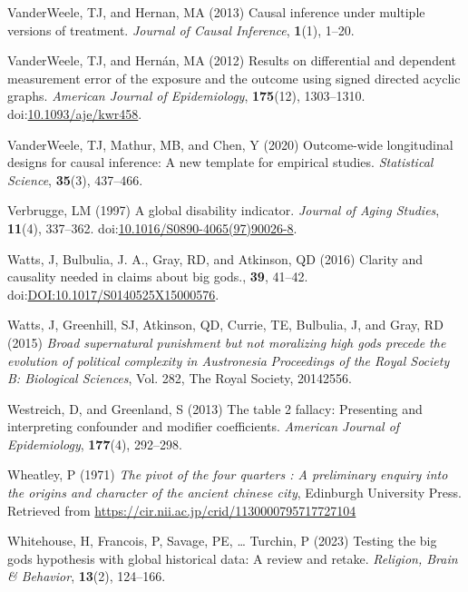 \documentclass[
  single column]{article}
\newlength{\cslhangindent}
\newenvironment{CSLReferences}[2] %
 {\begin{list}{}{%
  \setlength{\itemindent}{0pt}
  \setlength{\leftmargin}{0pt}
  \setlength{\parsep}{0pt}
  \ifodd #1
   \setlength{\leftmargin}{\cslhangindent}
   \setlength{\itemindent}{-1\cslhangindent}
  \fi
  \setlength{\itemsep}{#2\baselineskip}}}
 {\end{list}}
\begin{document}
\begin{CSLReferences}{1}{0}
VanderWeele, TJ, and Hernan, MA (2013) Causal inference under multiple
versions of treatment. \emph{Journal of Causal Inference},
\textbf{1}(1), 1--20.

VanderWeele, TJ, and Hernán, MA (2012) Results on differential and
dependent measurement error of the exposure and the outcome using signed
directed acyclic graphs. \emph{American Journal of Epidemiology},
\textbf{175}(12), 1303--1310.
doi:\href{https://doi.org/10.1093/aje/kwr458}{10.1093/aje/kwr458}.

VanderWeele, TJ, Mathur, MB, and Chen, Y (2020) Outcome-wide
longitudinal designs for causal inference: A new template for empirical
studies. \emph{Statistical Science}, \textbf{35}(3), 437--466.

Verbrugge, LM (1997) A global disability indicator. \emph{Journal of
Aging Studies}, \textbf{11}(4), 337--362.
doi:\href{https://doi.org/10.1016/S0890-4065(97)90026-8}{10.1016/S0890-4065(97)90026-8}.

Watts, J, Bulbulia, J. A., Gray, RD, and Atkinson, QD (2016) Clarity and
causality needed in claims about big gods., \textbf{39}, 41--42.
doi:\href{https://doi.org/DOI:10.1017/S0140525X15000576}{DOI:10.1017/S0140525X15000576}.

Watts, J, Greenhill, SJ, Atkinson, QD, Currie, TE, Bulbulia, J, and
Gray, RD (2015) \emph{Broad supernatural punishment but not moralizing
high gods precede the evolution of political complexity in
{A}ustronesia} \emph{Proceedings of the Royal Society B: Biological
Sciences}, Vol. 282, The Royal Society, 20142556.

Westreich, D, and Greenland, S (2013) The table 2 fallacy: Presenting
and interpreting confounder and modifier coefficients. \emph{American
Journal of Epidemiology}, \textbf{177}(4), 292--298.

Wheatley, P (1971) \emph{The pivot of the four quarters : A preliminary
enquiry into the origins and character of the ancient chinese city},
Edinburgh University Press. Retrieved from
\url{https://cir.nii.ac.jp/crid/1130000795717727104}

Whitehouse, H, Francois, P, Savage, PE, \ldots{} Turchin, P (2023)
Testing the big gods hypothesis with global historical data: A review
and retake. \emph{Religion, Brain \& Behavior}, \textbf{13}(2),
124--166.


\end{CSLReferences}
\end{document}
